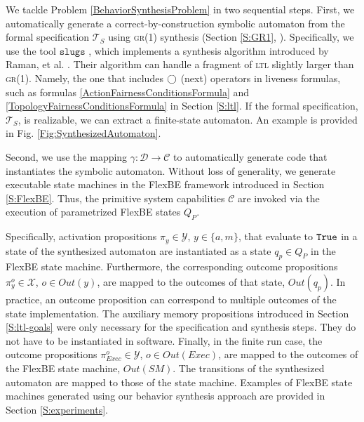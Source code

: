 
We tackle Problem \ref{BehaviorSynthesisProblem} in two sequential steps.
First, we automatically generate a correct-by-construction symbolic automaton from the formal specification $\mathcal{T}_S$ using \textsc{gr(1)} synthesis (Section \ref{S:GR1}, \cite{Bloem2012GR1}).
Specifically, we use the tool $\mathtt{slugs}$ \cite{SLUGS}, which implements a synthesis algorithm introduced by Raman, et al. \cite{Vasu2013ICRA, Vasu2015TRO}.
Their algorithm can handle a fragment of \textsc{ltl} slightly larger than \textsc{gr(1)}.
Namely, the one that includes $\operatorname{\bigcirc}$ (next) operators in liveness formulas, such as formulas \eqref{ActionFairnessConditionsFormula} and \eqref{TopologyFairnessConditionsFormula} in Section \ref{S:ltl}.
If the formal specification, $\mathcal{T}_S$, is realizable, we can extract a finite-state automaton.
An example is provided in Fig. \ref{Fig:SynthesizedAutomaton}.

Second, we use the mapping $\gamma: \mathcal{D} \rightarrow \mathcal{C}$ to automatically generate code that instantiates the symbolic automaton.
Without loss of generality, we generate executable state machines in the FlexBE framework introduced in Section \ref{S:FlexBE}.
Thus, the primitive system capabilities $\mathcal{C}$ are invoked via the execution of parametrized FlexBE states $Q_P$.

Specifically, activation propositions $\pi_y \in \mathcal{Y}$, $y \in \{ a, m \}$, that evaluate to $\mathtt{True}$ in a state of the synthesized automaton are instantiated as a state $q_p \in Q_P$ in the FlexBE state machine.
Furthermore, the corresponding outcome propositions $\pi_y^o \in \mathcal{X}$, $o \in Out(y)$, are mapped to the outcomes of that state, $Out(q_p)$.
In practice, an outcome proposition can correspond to multiple outcomes of the state implementation.
The auxiliary memory propositions introduced in Section \ref{S:ltl-goals} were only necessary for the specification and synthesis steps.
They do not have to be instantiated in software.
Finally, in the finite run case, the outcome propositions $\pi_{Exec}^o \in \mathcal{Y}$, $o \in Out(Exec)$, are mapped to the outcomes of the FlexBE state machine, $Out(SM)$.
The transitions of the synthesized automaton are mapped to those of the state machine.
Examples of FlexBE state machines generated using our behavior synthesis approach are provided in Section \ref{S:experiments}.

